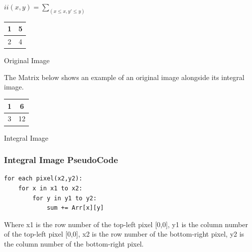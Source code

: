 \documentclass[12pt, letterpaper]{article}
\begin{document}
                \begin{center}
                    \(ii(x,y)= \sum_{(x \leq x,y' \leq y)}\)
                \end{center}

                \begin{center}
                    \begin{tabular}{ |c|c| }
                    \hline
                    1 & 5 \\ 
                    \hline
                    2 & 4 \\  
                    \hline
                    \end{tabular}

                    Original Image
                \end{center}
                The Matrix below shows an example of an original image 
                alongside its integral image. 

                \begin{center}
                    \begin{tabular}{ |c|c| }
                    \hline
                    1 & 6 \\ 
                    \hline
                    3 & 12 \\  
                    \hline
                    \end{tabular}

                    Integral Image
                \end{center}

            \subsubsection{Integral Image PseudoCode}
            \begin{verbatim}
for each pixel(x2,y2):
    for x in x1 to x2:
        for y in y1 to y2:
            sum += Arr[x][y]
            \end{verbatim}
            Where x1 is the row number of the top-left pixel [0,0], y1
            is the column number of the top-left pixel [0,0], x2 is the
            row number of the bottom-right pixel, y2  is the column
            number of the bottom-right pixel.
\end{document}
